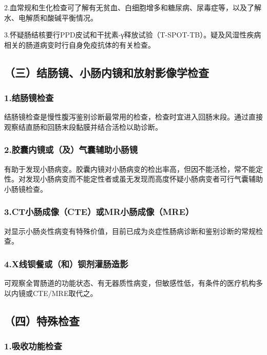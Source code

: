 2.血常规和生化检查可了解有无贫血、白细胞增多和糖尿病、尿毒症等，以及了解水、电解质和酸碱平衡情况。

3.怀疑肠结核要行PPD皮试和干扰素-γ释放试验（T-SPOT-TB）。疑及风湿性疾病相关的肠道病变时行自身免疫抗体的有关检查。

\subsection{（三）结肠镜、小肠内镜和放射影像学检查}

\subsubsection{1.结肠镜检查}

结肠镜检查是慢性腹泻鉴别诊断最常用的检查，检查时宜进入回肠末段。通过直接观察结直肠和回肠末段黏膜并结合活检以助诊断。

\subsubsection{2.胶囊内镜或（及）气囊辅助小肠镜}

有助于发现小肠病变。胶囊内镜对小肠病变的检出率高，但因不能活检，常不能定性。对发现小肠病变而不能定性者或虽无发现而高度怀疑小肠病变者可行气囊辅助小肠镜检查。

\subsubsection{3.CT小肠成像（CTE）或MR小肠成像（MRE）}

对显示小肠炎性病变有特殊价值，目前已成为炎症性肠病诊断和鉴别诊断的常规检查。

\subsubsection{4.X线钡餐或（和）钡剂灌肠造影}

可观察全胃肠道的功能状态、有无器质性病变，但敏感性低，有条件的医疗机构多以内镜或CTE/MRE取代之。

\subsection{（四）特殊检查}

\subsubsection{1.吸收功能检查}

